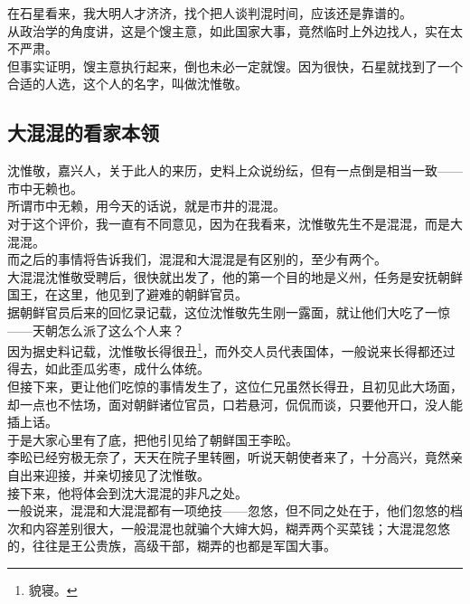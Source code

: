 \begin{multicols}{\theparacolNo}
在石星看来，我大明人才济济，找个把人谈判混时间，应该还是靠谱的。\\

从政治学的角度讲，这是个馊主意，如此国家大事，竟然临时上外边找人，实在太不严肃。\\

但事实证明，馊主意执行起来，倒也未必一定就馊。因为很快，石星就找到了一个合适的人选，这个人的名字，叫做沈惟敬。\\

\subsection{大混混的看家本领}
沈惟敬，嘉兴人，关于此人的来历，史料上众说纷纭，但有一点倒是相当一致——市中无赖也。\\

所谓市中无赖，用今天的话说，就是市井的混混。\\

对于这个评价，我一直有不同意见，因为在我看来，沈惟敬先生不是混混，而是大混混。\\

而之后的事情将告诉我们，混混和大混混是有区别的，至少有两个。\\

大混混沈惟敬受聘后，很快就出发了，他的第一个目的地是义州，任务是安抚朝鲜国王，在这里，他见到了避难的朝鲜官员。\\

据朝鲜官员后来的回忆录记载，这位沈惟敬先生刚一露面，就让他们大吃了一惊——天朝怎么派了这么个人来？\\

因为据史料记载，沈惟敬长得很丑\footnote{貌寝。}，而外交人员代表国体，一般说来长得都还过得去，如此歪瓜劣枣，成什么体统。\\

但接下来，更让他们吃惊的事情发生了，这位仁兄虽然长得丑，且初见此大场面，却一点也不怯场，面对朝鲜诸位官员，口若悬河，侃侃而谈，只要他开口，没人能插上话。\\

于是大家心里有了底，把他引见给了朝鲜国王李昖。\\

李昖已经穷极无奈了，天天在院子里转圈，听说天朝使者来了，十分高兴，竟然亲自出来迎接，并亲切接见了沈惟敬。\\

接下来，他将体会到沈大混混的非凡之处。\\

一般说来，混混和大混混都有一项绝技——忽悠，但不同之处在于，他们忽悠的档次和内容差别很大，一般混混也就骗个大婶大妈，糊弄两个买菜钱；大混混忽悠的，往往是王公贵族，高级干部，糊弄的也都是军国大事。\\


\end{multicols}
